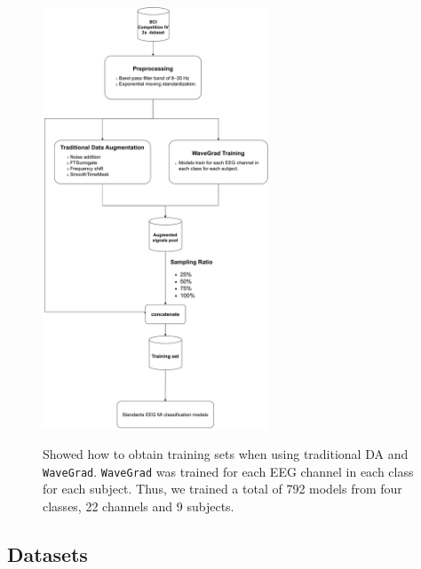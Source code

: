 \documentclass[12pt]{iopart}
\begin{document}
\begin{figure}[ht]
  \centering
  \caption[System Diagram]{\label{fig:System Diagram} Showed how to obtain training sets when using traditional DA and \texttt{WaveGrad}. \texttt{WaveGrad} was trained for each EEG channel in each class for each subject. Thus, we trained a total of 792 models from four classes, 22 channels and 9 subjects.}
  \includegraphics[width=0.6\textwidth]{fig/dyagram.pdf}
  \label{fig:System}
\end{figure}
\subsection{Datasets}
\end{document}
